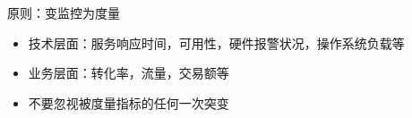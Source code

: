 \documentclass{beamer}
\begin{document}
\begin{CJK}{UTF8}{gbsn}
\begin{frame}{原则：变监控为度量}
  \begin{itemize}
  \item {技术层面：服务响应时间，可用性，硬件报警状况，操作系统负载等}
  \item {业务层面：转化率，流量，交易额等}
  \item {不要忽视被度量指标的任何一次突变}
  \end{itemize}
\end{frame}

\end{CJK}
\end{document}
